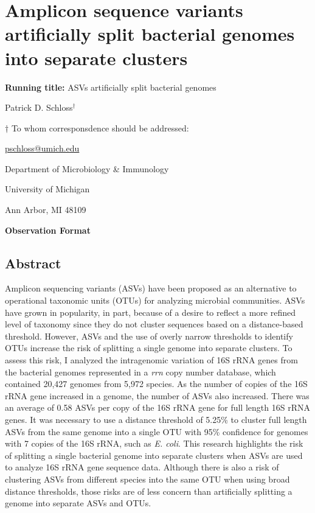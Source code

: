 \documentclass[
]{article}
\author{}
\date{\vspace{-2.5em}}
\begin{document}
\hypertarget{amplicon-sequence-variants-artificially-split-bacterial-genomes-into-separate-clusters}{%
\section{Amplicon sequence variants artificially split bacterial genomes
into separate
clusters}\label{amplicon-sequence-variants-artificially-split-bacterial-genomes-into-separate-clusters}}

\vspace{20mm}

\textbf{Running title:} ASVs artificially split bacterial genomes

\vspace{20mm}

Patrick D. Schloss\({^\dagger}\)

\vspace{40mm}

\({\dagger}\) To whom corresponsdence should be addressed:

\href{mailto:pschloss@umich.edu}{pschloss@umich.edu}

Department of Microbiology \& Immunology

University of Michigan

Ann Arbor, MI 48109

\vspace{20mm}

\textbf{Observation Format}

\newpage

\hypertarget{abstract}{%
\subsection{Abstract}\label{abstract}}

Amplicon sequencing variants (ASVs) have been proposed as an alternative
to operational taxonomic units (OTUs) for analyzing microbial
communities. ASVs have grown in popularity, in part, because of a desire
to reflect a more refined level of taxonomy since they do not cluster
sequences based on a distance-based threshold. However, ASVs and the use
of overly narrow thresholds to identify OTUs increase the risk of
splitting a single genome into separate clusters. To assess this risk, I
analyzed the intragenomic variation of 16S rRNA genes from the bacterial
genomes represented in a \emph{rrn} copy number database, which
contained 20,427 genomes from 5,972 species. As the number of copies of
the 16S rRNA gene increased in a genome, the number of ASVs also
increased. There was an average of 0.58 ASVs per copy of the 16S rRNA
gene for full length 16S rRNA genes. It was necessary to use a distance
threshold of 5.25\% to cluster full length ASVs from the same genome
into a single OTU with 95\% confidence for genomes with 7 copies of the
16S rRNA, such as \emph{E. coli}. This research highlights the risk of
splitting a single bacterial genome into separate clusters when ASVs are
used to analyze 16S rRNA gene sequence data. Although there is also a
risk of clustering ASVs from different species into the same OTU when
using broad distance thresholds, those risks are of less concern than
artificially splitting a genome into separate ASVs and OTUs.
\end{document}
